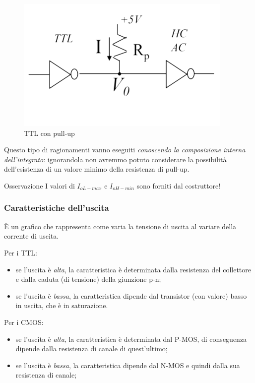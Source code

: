 \documentclass[
]{book}
\providecommand{\tightlist}{%
  \setlength{\itemsep}{0pt}\setlength{\parskip}{0pt}}
\begin{document}
\begin{figure}
\centering
\includegraphics[width=0.4\linewidth,height=\textheight,keepaspectratio]{immagini/37.png}
\caption{TTL con pull-up}
\end{figure}

Questo tipo di ragionamenti vanno eseguiti \emph{conoscendo la
composizione interna dell'integrato}: ignorandola non avremmo potuto
considerare la possibilità dell'esistenza di un valore minimo della
resistenza di pull-up.

\begin{orangebox}{Osservazione}
I valori di $I_{oL-max}$ e $I_{oH-min}$ sono forniti dal costruttore!
\end{orangebox}

\subsubsection{Caratteristiche
dell'uscita}\label{caratteristiche-delluscita}

È un grafico che rappresenta come varia la tensione di uscita al variare
della corrente di uscita.

Per i TTL:

\begin{itemize}
\tightlist
\item
  se l'uscita è \emph{alta}, la caratteristica è determinata dalla
  resistenza del collettore e dalla caduta (di tensione) della giunzione
  p-n;
\item
  se l'uscita è \emph{bassa}, la caratteristica dipende dal transistor
  (con valore) basso in uscita, che è in saturazione.
\end{itemize}

Per i CMOS:

\begin{itemize}
\tightlist
\item
  se l'uscita è \emph{alta}, la caratteristica è determinata dal P-MOS,
  di conseguenza dipende dalla resistenza di canale di quest'ultimo;
\item
  se l'uscita è \emph{bassa}, la caratteristica dipende dal N-MOS e
  quindi dalla sua resistenza di canale;
\end{itemize}
\end{document}
